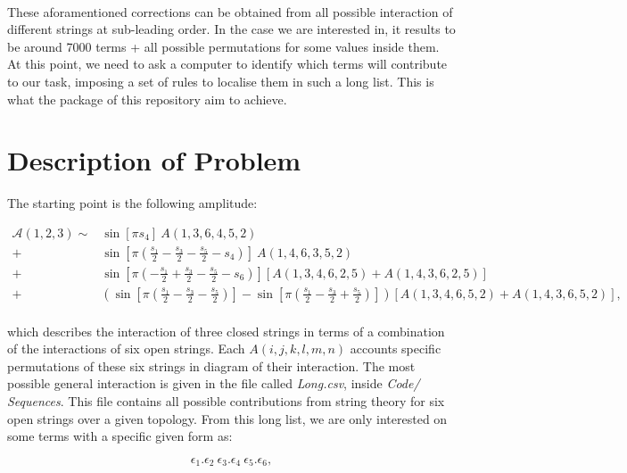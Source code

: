 \documentclass[11pt]{article} %
\begin{document}
\\
These aforamentioned corrections can be obtained from all possible interaction of different strings at sub-leading order. In the case we are interested in, it results to be around 7000 terms + all possible permutations for some values inside them. At this point, we need to ask a computer to identify which terms will contribute to our task, imposing a set of rules to localise them in such a long list. This is what the package of this repository aim to achieve.\\

\newpage
\section{Description of Problem}

The starting point is the following amplitude:

\begin{equation}\label{eq: Amplitude}
	\begin{aligned}
	\mathcal{A}(1,2,3) \sim & \sin \left[\pi s_4\right] \:A(1,3,6,4,5,2)\\
	+ & \sin \left[\pi\left(\tfrac{s_1}{2}-\tfrac{s_3}{2}-\tfrac{s_5}{2}-s_4\right)\right]\:A(1,4,6,3,5,2)\\
	+ & \sin \left[\pi\left(-\tfrac{s_1}{2}+\tfrac{s_3}{2}-\tfrac{s_5}{2}-s_6\right)\right][A(1,3,4,6,2,5) + A(1,4,3,6,2,5)] \\
	+ & \left(\sin \left[\pi\left(\tfrac{s_1}{2}-\tfrac{s_3}{2}-\tfrac{s_5}{2}\right)\right]-\sin \left[\pi\left(\tfrac{s_1}{2}-\tfrac{s_3}{2}+\tfrac{s_5}{2}\right)\right]\right) [A(1,3,4,6,5,2) + A(1,4,3,6,5,2)],
	\end{aligned}
\end{equation}\\
which describes the interaction of three closed strings in terms of a combination of the interactions of six open strings. Each $A(i,j,k,l,m,n)$ accounts specific permutations of these six strings in diagram of their interaction. The most possible general interaction is given in the file called \textit{Long.csv}, inside \textit{Code/ Sequences}. This file contains all possible contributions from string theory for six open strings over a given topology. From this long list, we are only interested on some terms with a specific given form as:

\begin{equation}\label{eq: Polarisation}
    \epsilon_{1}.\epsilon_{2}\:\epsilon_{3}.\epsilon_{4}\:\epsilon_{5}.\epsilon_{6},
\end{equation}
\end{document}
